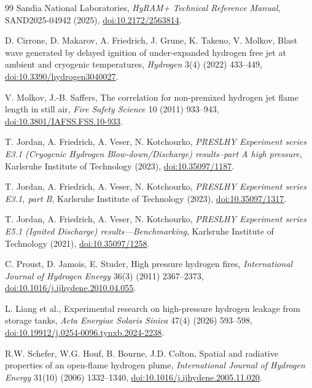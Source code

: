 \documentclass[12pt,a4paper]{article}
\begin{document}
\begin{thebibliography}{99}
Sandia National Laboratories, \textit{HyRAM+ Technical Reference Manual},
SAND2025-04942 (2025),
\href{https://doi.org/10.2172/2563814}{doi:10.2172/2563814}.

D. Cirrone, D. Makarov, A. Friedrich, J. Grune, K. Takeno, V. Molkov,
Blast wave generated by delayed ignition of under-expanded hydrogen free jet at
ambient and cryogenic temperatures, \textit{Hydrogen} 3(4) (2022) 433--449,
\href{https://doi.org/10.3390/hydrogen3040027}{doi:10.3390/hydrogen3040027}.

V. Molkov, J.-B. Saffers, The correlation for non-premixed hydrogen jet flame
length in still air, \textit{Fire Safety Science} 10 (2011) 933--943,
\href{https://doi.org/10.3801/IAFSS.FSS.10-933}{doi:10.3801/IAFSS.FSS.10-933}.

T. Jordan, A. Friedrich, A. Veser, N. Kotchourko, \textit{PRESLHY Experiment
series E3.1 (Cryogenic Hydrogen Blow-down/Discharge) results--part A high
pressure}, Karlsruhe Institute of Technology (2023),
\href{https://doi.org/10.35097/1187}{doi:10.35097/1187}.

T. Jordan, A. Friedrich, A. Veser, N. Kotchourko, \textit{PRESLHY Experiment
series E3.1, part B}, Karlsruhe Institute of Technology (2023),
\href{https://doi.org/10.35097/1317}{doi:10.35097/1317}.

T. Jordan, A. Friedrich, A. Veser, N. Kotchourko, \textit{PRESLHY Experiment
series E5.1 (Ignited Discharge) results---Benchmarking}, Karlsruhe Institute of
Technology (2021),
\href{https://doi.org/10.35097/1258}{doi:10.35097/1258}.

C. Proust, D. Jamois, E. Studer, High pressure hydrogen fires,
\textit{International Journal of Hydrogen Energy} 36(3) (2011) 2367--2373,
\href{https://doi.org/10.1016/j.ijhydene.2010.04.055}{doi:10.1016/j.ijhydene.2010.04.055}.

L. Liang et al., Experimental research on high-pressure hydrogen leakage from
storage tanks, \textit{Acta Energiae Solaris Sinica} 47(4) (2026) 593--598,
\href{https://doi.org/10.19912/j.0254-0096.tynxb.2024-2238}{doi:10.19912/j.0254-0096.tynxb.2024-2238}.

R.W. Schefer, W.G. Houf, B. Bourne, J.D. Colton, Spatial and radiative properties
of an open-flame hydrogen plume, \textit{International Journal of Hydrogen
Energy} 31(10) (2006) 1332--1340,
\href{https://doi.org/10.1016/j.ijhydene.2005.11.020}{doi:10.1016/j.ijhydene.2005.11.020}.


\end{thebibliography}
\end{document}
